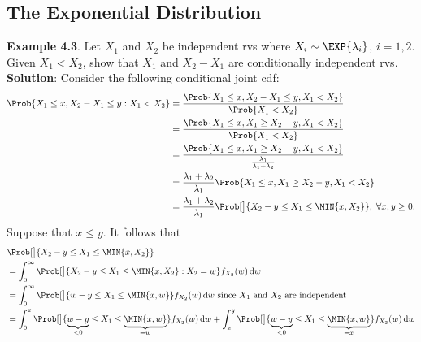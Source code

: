 \subsection*{The Exponential Distribution}
\begin{Example}
    \textbf{Example 4.3}. Let $ X_1 $ and $ X_2 $ be independent rvs where $ X_i \sim \EXP{\lambda_i} $, $ i=1,2 $. Given
    $ X_1<X_2 $, show that $ X_1 $ and $ X_2-X_1 $ are conditionally independent rvs.
    \tcblower{}
    \textbf{Solution}: Consider the following conditional joint cdf:
    \begin{align*}
        \Prob{X_1\le x,X_2-X_1\le y\given X_1<X_2}
         & =\frac{\Prob{X_1\le x,X_2-X_1\le y,X_1<X_2}}{\Prob{X_1<X_2}}                                       \\
         & =\frac{\Prob{X_1\le x,X_1\ge X_2-y,X_1<X_2}}{\Prob{X_1<X_2}}                                       \\
         & =\frac{\Prob{X_1\le x,X_1\ge X_2-y,X_1<X_2}}{\frac{\lambda_1}{\lambda_1+\lambda_2}}                \\
         & =\frac{\lambda_1+\lambda_2}{\lambda_1}\Prob{X_1\le x,X_1\ge X_2-y,X_1<X_2}                         \\
         & =\frac{\lambda_1+\lambda_2}{\lambda_1}\Prob[\big]{X_2-y\le X_1\le \MIN{x,X_2}},\;\forall x,y\ge 0.
    \end{align*}
    Suppose that $ x\le y $. It follows that
    \begin{align*}
         & \Prob[\big]{X_2-y\le X_1\le \MIN{x,X_2}}                                                                                                                                                                                                       \\
         & =\int_{0}^{\infty}\Prob[\big]{X_2-y\le X_1\le \MIN{x,X_2}\given X_2=w}f_{X_2}(w)\odif{w}                                                                                                                                                       \\
         & =\int_{0}^{\infty}\Prob[\big]{w-y\le X_1\le \MIN{x,w}}f_{X_2}(w)\odif{w} \text{ since $X_1$ and $X_2$ are independent}                                                                                                                         \\
         & =\int_{0}^{x}\Prob[\big]{\underbrace{w-y}_{<0}\le X_1\le \underbrace{\MIN{x,w}}_{=w}}f_{X_2}(w)\odif{w}+\int_{x}^{y}\Prob[\big]{\underbrace{w-y}_{<0}\le X_1\le \underbrace{\MIN{x,w}}_{=x}}f_{X_2}(w)\odif{w}                                 \\

\end{align*}
\end{Example}
